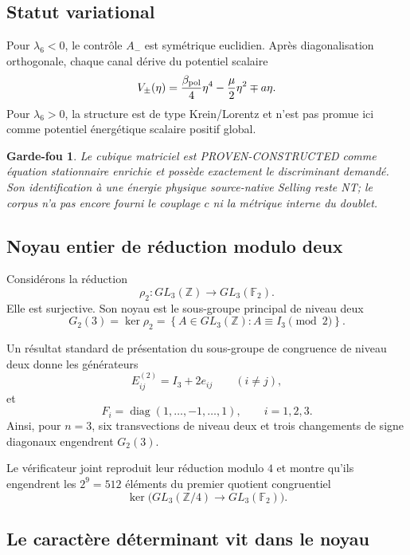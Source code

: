 \documentclass[11pt,a4paper]{article}
\newtheorem{guardrail}[theorem]{Garde-fou}
\begin{document}
\subsection{Statut variational}

Pour $\lambda_6<0$, le contrôle $A_-$ est symétrique euclidien. Après diagonalisation orthogonale, chaque canal dérive du potentiel scalaire
\[
V_\pm(\eta)
=
\frac{\beta_{\rm pol}}4\eta^4
-
\frac\mu2\eta^2
\mp a\eta.
\]
Pour $\lambda_6>0$, la structure est de type Krein/Lorentz et n'est pas promue ici comme potentiel énergétique scalaire positif global.

\begin{guardrail}
Le cubique matriciel est \emph{PROVEN-CONSTRUCTED} comme équation stationnaire enrichie et possède exactement le discriminant demandé. Son identification à une énergie physique source-native Selling reste \emph{NT}; le corpus n'a pas encore fourni le couplage $c$ ni la métrique interne du doublet.
\end{guardrail}

\subsection{Noyau entier de réduction modulo deux}

Considérons la réduction
\[
\rho_2:
GL_3(\mathbb Z)
\longrightarrow
GL_3(\mathbb F_2).
\]
Elle est surjective. Son noyau est le sous-groupe principal de niveau deux
\begin{equation}\label{eq:v22-Gamma2}
\boxed{
G_2(3)
=
\ker\rho_2
=
\left\{
A\in GL_3(\mathbb Z):
A\equiv I_3\pmod2
\right\}.}
\end{equation}

Un résultat standard de présentation du sous-groupe de congruence de niveau deux donne les générateurs
\[
E_{ij}^{(2)}
=
I_3+2e_{ij}
\qquad(i\neq j),
\]
et
\[
F_i
=
\operatorname{diag}
(1,\ldots,-1,\ldots,1),
\qquad i=1,2,3.
\]
Ainsi, pour $n=3$, six transvections de niveau deux et trois changements de signe diagonaux engendrent $G_2(3)$.

Le vérificateur joint reproduit leur réduction modulo $4$ et montre qu'ils engendrent les $2^9=512$ éléments du premier quotient congruentiel
\[
\ker\bigl(
GL_3(\mathbb Z/4)
\to
GL_3(\mathbb F_2)
\bigr).
\]

\subsection{Le caractère déterminant vit dans le noyau}
\end{document}
